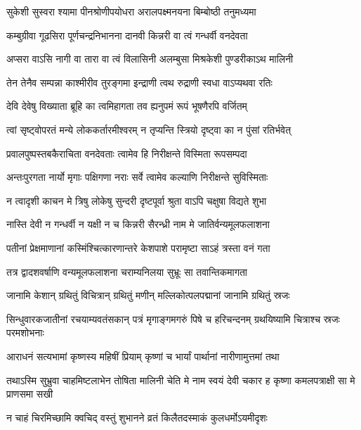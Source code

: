 \twolineshloka
{सुकेशी सुस्वरा श्यामा पीनश्रोणीपयोधरा}
{अरालपक्ष्मनयना बिम्बोष्ठी तनुमध्यमा}


\twolineshloka
{कम्बुग्रीवा गूढसिरा पूर्णचन्द्रनिभानना}
{दानवी किन्नरी वा त्वं गन्धर्वी वनदेवता}


\twolineshloka
{अप्सरा वाऽसि नागी वा तारा वा त्वं विलासिनी}
{अलम्बुसा मिश्रकेशी पुण्डरीकाऽथ मालिनी}


\twolineshloka
{तेन तेनैव सम्पन्ना काश्मीरीव तुरङ्गमा}
{इन्द्राणी त्वथ रुद्राणी स्वधा वाऽप्यथवा रतिः}


\twolineshloka
{देवि देवेषु विख्याता ब्रूहि का त्वमिहागता}
{तव ह्यनुपमं रूपं भूषणैरपि वर्जितम्}


\twolineshloka
{त्वां सृष्ट्वोपरतं मन्ये लोककर्तारमीश्वरम्}
{न तृप्यन्ति स्त्रियो दृष्ट्वा का न पुंसां रतिर्भवेत्}


\twolineshloka
{प्रवालपुष्पस्तबकैराचिता वनदेवताः}
{त्वामेव हि निरीक्षन्ते विस्मिता रूपसम्पदा}


\twolineshloka
{अन्तःपुरगता नार्यो मृगाः पक्षिगणा नराः}
{सर्वे त्वामेव कल्याणि निरीक्षन्ते सुविस्मिताः}


\twolineshloka
{न त्वादृशी काचन मे त्रिषु लोकेषु सुन्दरी}
{दृष्टपूर्वा श्रुता वाऽपि चक्षुषा विद्यते शुभा}




\twolineshloka
{नास्ति देवी न गन्धर्वी न यक्षी न च किन्नरी}
{सैरन्ध्री नाम मे जातिर्वन्यमूलफलाशना}


\twolineshloka
{पतीनां प्रेक्षमाणानां कस्मिंश्चित्कारणान्तरे}
{केशपाशे परामृष्टा साऽहं त्रस्ता वनं गता}


\twolineshloka
{तत्र द्वादशवर्षाणि वन्यमूलफलाशना}
{चराम्यनिलया सुभ्रूः सा तवान्तिकमागता}


\twolineshloka
{जानामि केशान् ग्रथितुं विचित्रान् ग्रथितुं मणीन्}
{मल्लिकोत्पलपद्मानां जानामि ग्रथितुं स्रजः}


\threelineshloka
{सिन्धुवारकजातीनां रचयाम्यवतंसकान्}
{पत्रं मृगाङ्गमगरुं पिषे च हरिचन्दनम्}
{ग्रथयिष्यामि चित्राश्च स्रजः परमशोभनाः}


\twolineshloka
{आराधनं सत्यभामां कृष्णस्य महिषीं प्रियाम्}
{कृष्णां च भार्यां पार्थानां नारीणामुत्तमां तथा}


\threelineshloka
{तथाऽस्मि सुभ्रुवा चाहमिष्टलाभेन तोषिता}
{मालिनी चेति मे नाम स्वयं देवी चकार ह}
{कृष्णा कमलपत्राक्षी सा मे प्राणसमा सखी}


\twolineshloka
{न चाहं चिरमिच्छामि क्वचिद् वस्तुं शुभानने}
{व्रतं किलैतदस्माकं कुलधर्मोऽयमीदृशः}


